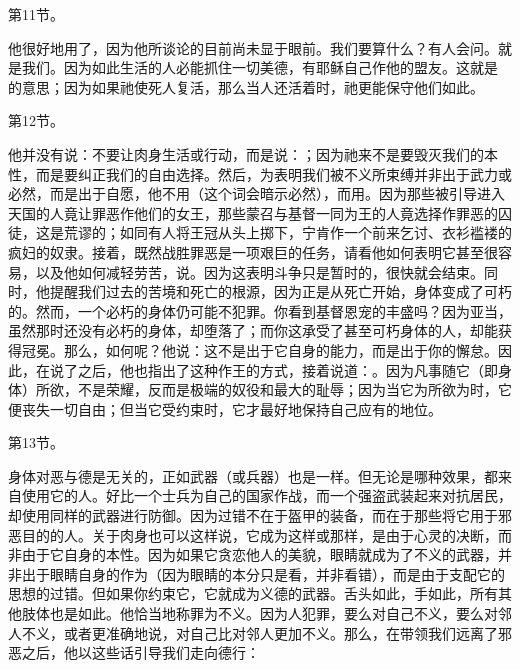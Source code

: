 第11节。\par

他很好地用了，因为他所谈论的目前尚未显于眼前。我们要算什么？有人会问。就是我们。因为如此生活的人必能抓住一切美德，有耶稣自己作他的盟友。这就是 的意思；因为如果祂使死人复活，那么当人还活着时，祂更能保守他们如此。\par

第12节。\par

他并没有说：不要让肉身生活或行动，而是说：；因为祂来不是要毁灭我们的本性，而是要纠正我们的自由选择。然后，为表明我们被不义所束缚并非出于武力或必然，而是出于自愿，他不用（这个词会暗示必然），而用。因为那些被引导进入天国的人竟让罪恶作他们的女王，那些蒙召与基督一同为王的人竟选择作罪恶的囚徒，这是荒谬的；如同有人将王冠从头上掷下，宁肯作一个前来乞讨、衣衫褴褛的疯妇的奴隶。接着，既然战胜罪恶是一项艰巨的任务，请看他如何表明它甚至很容易，以及他如何减轻劳苦，说。因为这表明斗争只是暂时的，很快就会结束。同时，他提醒我们过去的苦境和死亡的根源，因为正是从死亡开始，身体变成了可朽的。然而，一个必朽的身体仍可能不犯罪。你看到基督恩宠的丰盛吗？因为亚当，虽然那时还没有必朽的身体，却堕落了；而你这承受了甚至可朽身体的人，却能获得冠冕。那么，如何呢？他说：这不是出于它自身的能力，而是出于你的懈怠。因此，在说了之后，他也指出了这种作王的方式，接着说道：。因为凡事随它（即身体）所欲，不是荣耀，反而是极端的奴役和最大的耻辱；因为当它为所欲为时，它便丧失一切自由；但当它受约束时，它才最好地保持自己应有的地位。\par

第13节。\par

身体对恶与德是无关的，正如武器（或兵器）也是一样。但无论是哪种效果，都来自使用它的人。好比一个士兵为自己的国家作战，而一个强盗武装起来对抗居民，却使用同样的武器进行防御。因为过错不在于盔甲的装备，而在于那些将它用于邪恶目的的人。关于肉身也可以这样说，它成为这样或那样，是由于心灵的决断，而非由于它自身的本性。因为如果它贪恋他人的美貌，眼睛就成为了不义的武器，并非出于眼睛自身的作为（因为眼睛的本分只是看，并非看错），而是由于支配它的思想的过错。但如果你约束它，它就成为义德的武器。舌头如此，手如此，所有其他肢体也是如此。他恰当地称罪为不义。因为人犯罪，要么对自己不义，要么对邻人不义，或者更准确地说，对自己比对邻人更加不义。那么，在带领我们远离了邪恶之后，他以这些话引导我们走向德行：\par

